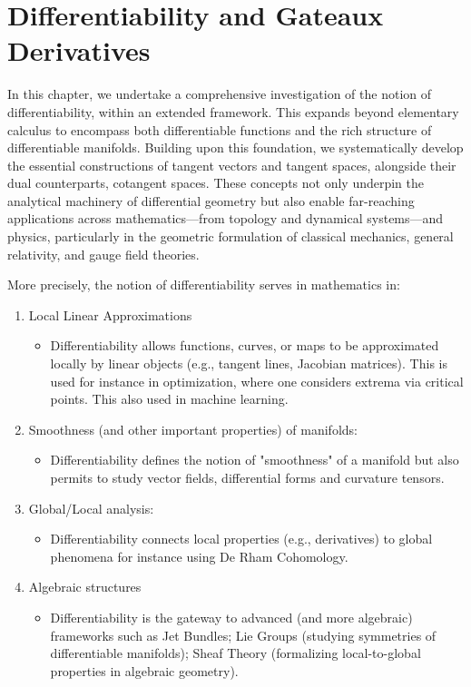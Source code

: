 \chapter{Differentiability and Gateaux Derivatives}

In this chapter, we undertake a comprehensive investigation of the notion of differentiability, within an extended framework. This expands beyond elementary calculus to encompass both differentiable functions and the rich structure of differentiable manifolds. Building upon this foundation, we systematically develop the essential constructions of tangent vectors and tangent spaces, alongside their dual counterparts, cotangent spaces. These concepts not only underpin the analytical machinery of differential geometry but also enable far-reaching applications across mathematics—from topology and dynamical systems—and physics, particularly in the geometric formulation of classical mechanics, general relativity, and gauge field theories.

More precisely, the notion of differentiability serves in mathematics in:  
\begin{enumerate}
    \item Local Linear Approximations
    \begin{itemize}
        \item Differentiability allows functions, curves, or maps to be approximated locally by linear objects (e.g., tangent lines, Jacobian matrices). This is used for instance in optimization, where one considers extrema via critical points. This also used in machine learning. 
    \end{itemize}
    \item Smoothness (and other important properties) of manifolds:

    \begin{itemize}
        \item Differentiability defines the notion of "smoothness" of a manifold but also permits to study  vector fields, differential forms and curvature tensors. 
    \end{itemize}
    \item Global/Local analysis: 
    \begin{itemize}
        \item Differentiability connects local properties (e.g., derivatives) to global phenomena for instance using De Rham Cohomology.
        \end{itemize}
    \item Algebraic structures
    \begin{itemize}
        \item
    Differentiability is the gateway to advanced (and more algebraic) frameworks such as 
Jet Bundles; Lie Groups (studying symmetries of differentiable manifolds); Sheaf Theory (formalizing local-to-global properties in algebraic geometry).
\end{itemize}
\end{enumerate}


